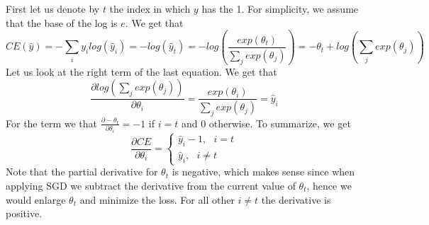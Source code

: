 First let us denote by $t$ the index in which $y$ has the 1. For simplicity, we assume that the base of the log is $e$.
We get that 
$$CE(\hat{y})= -\sum_i y_i log(\hat{y}_i)=-log(\hat{y}_t)=-log(\frac{exp(\theta_t)}{\sum_j exp(\theta_j)})=-\theta_t + log(\sum_j exp(\theta_j))$$
Let us look at the right term of the last equation. We get that $$\frac{\partial log(\sum_j exp(\theta_j))}{\partial \theta_i}=\frac{exp(\theta_i)}{\sum_j exp(\theta_j)}=\hat{y}_i$$
For the term we that $\frac{\partial -\theta_t}{\partial \theta_i}=-1$ if $i=t$ and $0$ otherwise. To summarize, we get 
$$
\frac{\partial CE}{\partial \theta_i}=
\begin{cases}
\hat{y}_i - 1, \text{ } i=t  \\ 
\hat{y}_i, \text{     } i\neq t
\end{cases}
$$
Note that the partial derivative for $\theta_t$ is negative, which makes sense since when applying SGD we subtract the derivative from the current value of $\theta_t$, hence we would enlarge $\theta_t$ and minimize the loss. For all other $i \neq t$ the derivative is positive.